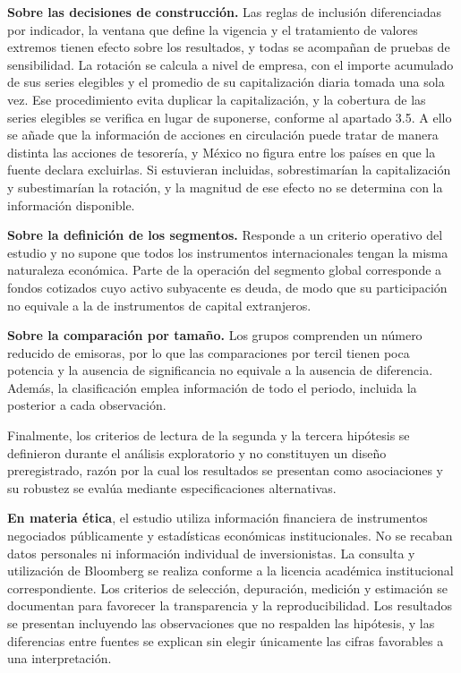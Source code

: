 \textbf{Sobre las decisiones de construcción.} Las reglas de inclusión diferenciadas por indicador, la ventana que define la vigencia y el tratamiento de valores extremos tienen efecto sobre los resultados, y todas se acompañan de pruebas de sensibilidad. La rotación se calcula a nivel de empresa, con el importe acumulado de sus series elegibles y el promedio de su capitalización diaria tomada una sola vez. Ese procedimiento evita duplicar la capitalización, y la cobertura de las series elegibles se verifica en lugar de suponerse, conforme al apartado 3.5. A ello se añade que la información de acciones en circulación puede tratar de manera distinta las acciones de tesorería, y México no figura entre los países en que la fuente declara excluirlas. Si estuvieran incluidas, sobrestimarían la capitalización y subestimarían la rotación, y la magnitud de ese efecto no se determina con la información disponible.

\textbf{Sobre la definición de los segmentos.} Responde a un criterio operativo del estudio y no supone que todos los instrumentos internacionales tengan la misma naturaleza económica. Parte de la operación del segmento global corresponde a fondos cotizados cuyo activo subyacente es deuda, de modo que su participación no equivale a la de instrumentos de capital extranjeros.

\textbf{Sobre la comparación por tamaño.} Los grupos comprenden un número reducido de emisoras, por lo que las comparaciones por tercil tienen poca potencia y la ausencia de significancia no equivale a la ausencia de diferencia. Además, la clasificación emplea información de todo el periodo, incluida la posterior a cada observación.

Finalmente, los criterios de lectura de la segunda y la tercera hipótesis se definieron durante el análisis exploratorio y no constituyen un diseño preregistrado, razón por la cual los resultados se presentan como asociaciones y su robustez se evalúa mediante especificaciones alternativas.

\textbf{En materia ética}, el estudio utiliza información financiera de instrumentos negociados públicamente y estadísticas económicas institucionales. No se recaban datos personales ni información individual de inversionistas. La consulta y utilización de Bloomberg se realiza conforme a la licencia académica institucional correspondiente. Los criterios de selección, depuración, medición y estimación se documentan para favorecer la transparencia y la reproducibilidad. Los resultados se presentan incluyendo las observaciones que no respalden las hipótesis, y las diferencias entre fuentes se explican sin elegir únicamente las cifras favorables a una interpretación.

